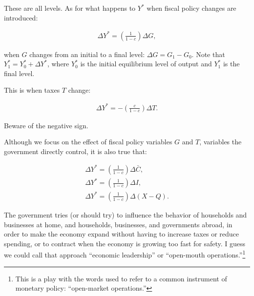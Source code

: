\documentclass[12pt]{article}
\begin{document}
These are all levels.  As for what happens to $Y^*$ when fiscal policy changes are introduced:

\begin{eqnarray} \Delta Y^* = \left( \frac{1}{1 - c} \right) \Delta G, \end{eqnarray}

\noindent when $G$ changes from an initial to a final level: $\Delta G = G_1 - G_0$.  Note that $Y^*_1 = Y^*_0 + \Delta Y^*$, where $Y^*_0$ is the initial equilibrium level of output and $Y^*_1$ is the final level.

This is when taxes $T$ change:

\begin{eqnarray} \Delta Y^* = - \left( \frac{c}{1 - c} \right) \Delta T. \end{eqnarray}

Beware of the negative sign.

Although we focus on the effect of fiscal policy variables $G$ and $T$, variables the government directly control, it is also true that:

\begin{eqnarray} 
\Delta Y^* = \left( \frac{1}{1 - c} \right) \Delta \bar{C}, \\
\Delta Y^* = \left( \frac{1}{1 - c} \right) \Delta I, \\
\Delta Y^* = \left( \frac{1}{1 - c} \right) \Delta (X-Q).
\end{eqnarray}

The government tries (or should try) to influence the behavior of households and businesses at home, and households, businesses, and governments abroad, in order to make the economy expand without having to increase taxes or reduce spending, or to contract when the economy is growing too fast for safety.  I guess we could call that approach ``economic leadership'' or ``open-mouth operations.''\footnote{This is a play with the words used to refer to a common instrument of monetary policy: ``open-market operations.''}
\end{document}
